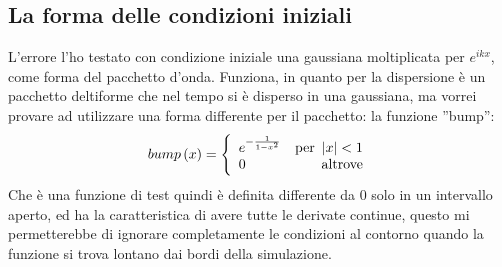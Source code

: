 \subsection{La forma delle condizioni iniziali}
L'errore l'ho testato con condizione iniziale una gaussiana moltiplicata per $e^{ikx}$, come forma del pacchetto d'onda. Funziona, in quanto per la dispersione \`e un pacchetto deltiforme che nel tempo si \`e disperso in una gaussiana, ma vorrei provare ad utilizzare una forma differente per il pacchetto: la funzione ''bump'':
\begin{equation}
bump\lrt{x} = \lr\{.{\begin{array}{lr}
	e^{-\frac{1}{1-x^2}}&\text{per }\lr||{x}<1\\
	0&\text{altrove}
	\end{array}}
\end{equation}
Che \`e una funzione di test quindi \`e definita differente da 0 solo in un intervallo aperto, ed ha la caratteristica di avere tutte le derivate continue, questo mi permetterebbe di ignorare completamente le condizioni al contorno quando la funzione si trova lontano dai bordi della simulazione.
